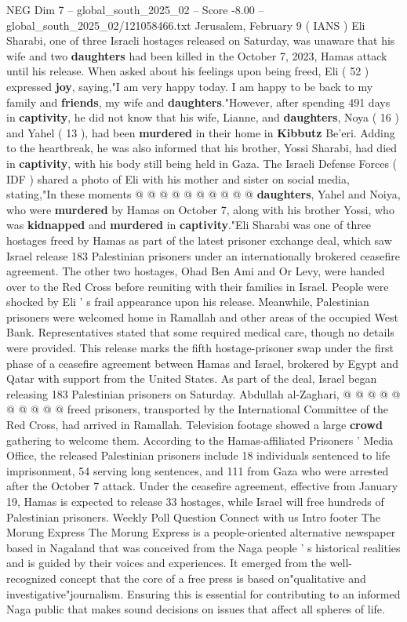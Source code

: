 \begin{textsample}{NEG Dim 7 – global\_south\_2025\_02 – Score -8.00 – global\_south\_2025\_02/121058466.txt}  \label{ex:f7_neg_263}
Jerusalem, February 9 ( IANS ) Eli Sharabi, one of three Israeli hostages released on Saturday, was unaware that his wife and two \textbf{daughters} had been killed in the October 7, 2023, Hamas attack until his release.
When asked about his feelings upon being freed, Eli ( 52 ) expressed \textbf{joy}, saying,"I am very happy today.
I am happy to be back to my family and \textbf{friends}, my wife and \textbf{daughters}."However, after spending 491 days in \textbf{captivity}, he did not know that his wife, Lianne, and \textbf{daughters}, Noya ( 16 ) and Yahel ( 13 ), had been \textbf{murdered} in their home in \textbf{Kibbutz} Be'eri.
Adding to the heartbreak, he was also informed that his brother, Yossi Sharabi, had died in \textbf{captivity}, with his body still being held in Gaza.
The Israeli Defense Forces ( IDF ) shared a photo of Eli with his mother and sister on social media, stating,"In these moments @ @ @ @ @ @ @ @ @ @ \textbf{daughters}, Yahel and Noiya, who were \textbf{murdered} by Hamas on October 7, along with his brother Yossi, who was \textbf{kidnapped} and \textbf{murdered} in \textbf{captivity}."Eli Sharabi was one of three hostages freed by Hamas as part of the latest prisoner exchange deal, which saw Israel release 183 Palestinian prisoners under an internationally brokered ceasefire agreement.
The other two hostages, Ohad Ben Ami and Or Levy, were handed over to the Red Cross before reuniting with their families in Israel.
People were shocked by Eli ' s frail appearance upon his release.
Meanwhile, Palestinian prisoners were welcomed home in Ramallah and other areas of the occupied West Bank.
Representatives stated that some required medical care, though no details were provided.
This release marks the fifth hostage-prisoner swap under the first phase of a ceasefire agreement between Hamas and Israel, brokered by Egypt and Qatar with support from the United States.
As part of the deal, Israel began releasing 183 Palestinian prisoners on Saturday.
Abdullah al-Zaghari, @ @ @ @ @ @ @ @ @ @ freed prisoners, transported by the International Committee of the Red Cross, had arrived in Ramallah.
Television footage showed a large \textbf{crowd} gathering to welcome them.
According to the Hamas-affiliated Prisoners ' Media Office, the released Palestinian prisoners include 18 individuals sentenced to life imprisonment, 54 serving long sentences, and 111 from Gaza who were arrested after the October 7 attack.
Under the ceasefire agreement, effective from January 19, Hamas is expected to release 33 hostages, while Israel will free hundreds of Palestinian prisoners.
Weekly Poll Question Connect with us Intro footer The Morung Express The Morung Express is a people-oriented alternative newspaper based in Nagaland that was conceived from the Naga people ' s historical realities and is guided by their voices and experiences.
It emerged from the well-recognized concept that the core of a free press is based on"qualitative and investigative"journalism.
Ensuring this is essential for contributing to an informed Naga public that makes sound decisions on issues that affect all spheres of life.


\end{textsample}
